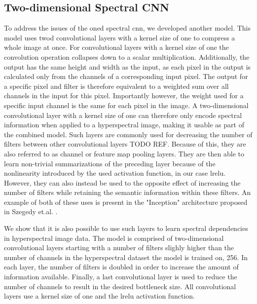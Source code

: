 \subsection{Two-dimensional Spectral CNN\label{sec:fastconv1d}}
To address the issues of the \ac{oned} spectral \ac{cnn}, we developed another model. This model uses \ac{twod} convolutional layers with a kernel size of one to compress a whole image at once. For convolutional layers with a kernel size of one the convolution operation collapses down to a scalar multiplication. Additionally, the output has the same height and width as the input, as each pixel in the output is calculated only from the channels of a corresponding input pixel. The output for a specific pixel and filter is therefore equivalent to a weighted sum over all channels in the input for this pixel. Importantly however, the weight used for a specific input channel is the same for each pixel in the image. A two-dimensional convolutional layer with a kernel size of one can therefore only encode spectral information when applied to a hyperspectral image, making it usable as part of the combined model. Such layers are commonly used for decreasing the number of filters between other convolutional layers TODO REF. Because of this, they are also referred to as channel or feature map pooling layers. They are then able to learn non-trivial summarizations of the preceding layer because of the nonlinearity introduced by the used activation function, in our case \ac{lrelu}. However, they can also instead be used to the opposite effect of increasing the number of filters while retaining the semantic information within these filters. An example of both of these uses is present in the "Inception" architecture proposed in Szegedy et.al. \citep{szegedy_going_2014}.

We show that it is also possible to use such layers to learn spectral dependencies in hyperspectral image data. The model is comprised of two-dimensional convolutional layers starting with a number of filters slighly higher than the number of channels in the hyperspectral dataset the model is trained on, 256. In each layer, the number of filters is doubled in order to increase the amount of information available. Finally, a last convolutional layer is used to reduce the number of channels to result in the desired bottleneck size. All convolutional layers use a kernel size of one and the \ac{lrelu} activation function.

